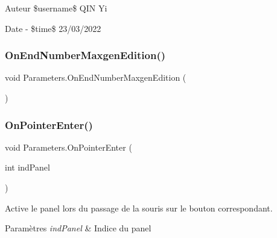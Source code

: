 \begin{DoxyAuthor}{Auteur}
\$username\$ Q\+IN Yi 
\end{DoxyAuthor}
\begin{DoxyDate}{Date}
-\/ \$time\$ 23/03/2022
\end{DoxyDate}
\mbox{\label{class_parameters_a4167680889821ca1d2f3bc487b0bebae}} 
\subsubsection{\texorpdfstring{On\+End\+Number\+Maxgen\+Edition()}{OnEndNumberMaxgenEdition()}}
{\footnotesize\ttfamily void Parameters.\+On\+End\+Number\+Maxgen\+Edition (\begin{DoxyParamCaption}{ }\end{DoxyParamCaption})\hspace{0.3cm}{\ttfamily [inline]}}





\mbox{\label{class_parameters_aa0a97bc80e6c1cdf8a43513c187f33aa}} 
\subsubsection{\texorpdfstring{On\+Pointer\+Enter()}{OnPointerEnter()}}
{\footnotesize\ttfamily void Parameters.\+On\+Pointer\+Enter (\begin{DoxyParamCaption}\item[{int}]{ind\+Panel }\end{DoxyParamCaption})\hspace{0.3cm}{\ttfamily [inline]}}



Active le panel lors du passage de la souris sur le bouton correspondant. 


\begin{DoxyParams}{Paramètres}
{\em ind\+Panel} & Indice du panel\\
\hline
\end{DoxyParams}
\mbox{\label{class_parameters_a711df8be88106725f5e1cf4bf74a5e21}} 
